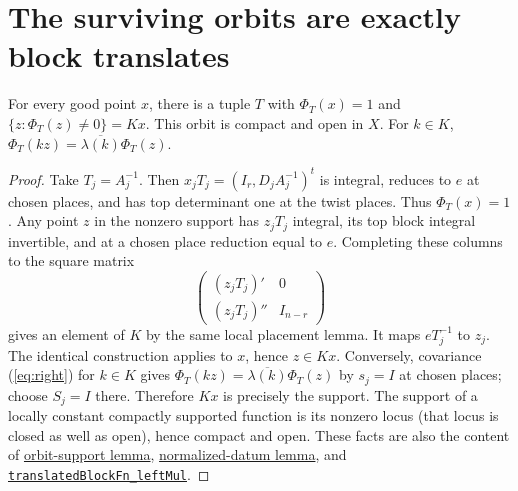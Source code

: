 \documentclass[11pt,letterpaper]{article}
\newcommand{\baseurl}{https://github.com/VladimirReshetnikov/ProveIt/blob/9050b04000647d588d0c78d945180abcd3b0bcf7/Analysis/GeneralizedRiemannHypothesis/}
\newcommand{\src}[3]{\href{\baseurl Lean/grh/src/#1.lean\#L#2}{#3}}
\newcommand{\bottomref}[2]{\src{New/OneLift/FalseLifts/BottomOfTower}{#1}{#2}}
\begin{document}
\section{The surviving orbits are exactly block translates}
\begin{lemma}\label{lem:good}
For every good point $x$, there is a tuple $T$ with $\Phi_T(x)=1$ and $\{z:\Phi_T(z)\ne0\}=Kx$. This orbit is compact and open in $X$. For $k\in K$, $\Phi_T(kz)=\overline{\lambda(k)}\Phi_T(z)$.
\end{lemma}
\begin{proof}
Take $T_j=A_j^{-1}$. Then $x_jT_j=(I_r,D_jA_j^{-1})^t$ is integral, reduces to $e$ at chosen places, and has top determinant one at the twist places. Thus $\Phi_T(x)=1$. Any point $z$ in the nonzero support has $z_j T_j$ integral, its top block integral invertible, and at a chosen place reduction equal to $e$. Completing these columns to the square matrix
\[
 \begin{pmatrix}(z_jT_j)'&0\\ (z_jT_j)''&I_{n-r}\end{pmatrix}
\]
gives an element of $K$ by the same local placement lemma. It maps $eT_j^{-1}$ to $z_j$. The identical construction applies to $x$, hence $z\in Kx$. Conversely, covariance (\ref{eq:right}) for $k\in K$ gives $\Phi_T(kz)=\overline{\lambda(k)}\Phi_T(z)$ by $s_j=I$ at chosen places; choose $S_j=I$ there. Therefore $Kx$ is precisely the support. The support of a locally constant compactly supported function is its nonzero locus (that locus is closed as well as open), hence compact and open. These facts are also the content of \bottomref{833}{orbit-support lemma}, \bottomref{955}{normalized-datum lemma}, and \bottomref{797}{\texttt{translatedBlockFn\_leftMul}}.
\end{proof}
\end{document}
